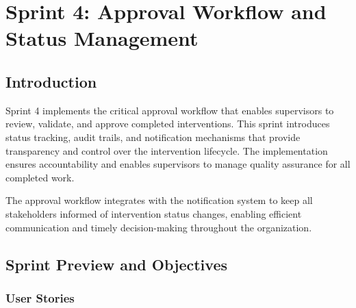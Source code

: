 
\chapter{Sprint 4: Approval Workflow and Status Management}

\section{Introduction}

Sprint 4 implements the critical approval workflow that enables supervisors to review, validate, and approve completed interventions. This sprint introduces status tracking, audit trails, and notification mechanisms that provide transparency and control over the intervention lifecycle. The implementation ensures accountability and enables supervisors to manage quality assurance for all completed work.

The approval workflow integrates with the notification system to keep all stakeholders informed of intervention status changes, enabling efficient communication and timely decision-making throughout the organization.

\section{Sprint Preview and Objectives}

\subsection{User Stories}

